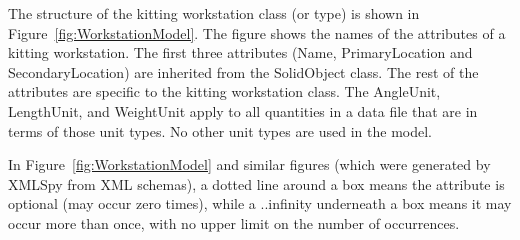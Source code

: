 The structure of the kitting workstation class (or type) is shown in
Figure~\ref{fig:WorkstationModel}. The figure shows the names of the
attributes of a kitting workstation. The first three attributes (Name,
PrimaryLocation and SecondaryLocation) are inherited from the SolidObject
class. The rest of the attributes are specific to the kitting workstation
class. The AngleUnit, LengthUnit, and WeightUnit apply to all quantities in
a data file that are in terms of those unit types. No other unit types are
used in the model.

In Figure~\ref{fig:WorkstationModel} and similar figures (which were
generated by XMLSpy from XML schemas), a dotted line around a box
means the attribute is optional (may occur zero times), while a \sf
..infinity \rm underneath a box means it may occur more than once, with no
upper limit on the number of occurrences.

\begin{flushleft}
\end{flushleft}

